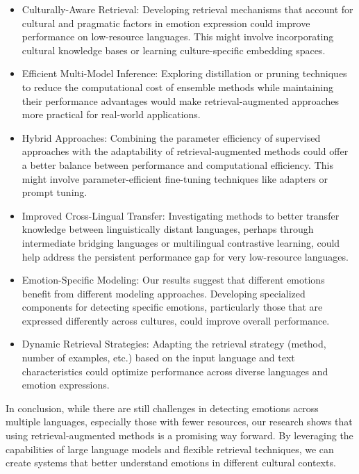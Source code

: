 \documentclass[a4paper,12pt]{extarticle}
\begin{document}
\begin{itemize}
    \item Culturally-Aware Retrieval: Developing retrieval mechanisms that account for cultural and pragmatic factors in emotion expression could improve performance on low-resource languages. This might involve incorporating cultural knowledge bases or learning culture-specific embedding spaces.
    
    \item Efficient Multi-Model Inference: Exploring distillation or pruning techniques to reduce the computational cost of ensemble methods while maintaining their performance advantages would make retrieval-augmented approaches more practical for real-world applications.
    
    \item Hybrid Approaches: Combining the parameter efficiency of supervised approaches with the adaptability of retrieval-augmented methods could offer a better balance between performance and computational efficiency. This might involve parameter-efficient fine-tuning techniques like adapters or prompt tuning.
    
    \item Improved Cross-Lingual Transfer: Investigating methods to better transfer knowledge between linguistically distant languages, perhaps through intermediate bridging languages or multilingual contrastive learning, could help address the persistent performance gap for very low-resource languages.
    
    \item Emotion-Specific Modeling: Our results suggest that different emotions benefit from different modeling approaches. Developing specialized components for detecting specific emotions, particularly those that are expressed differently across cultures, could improve overall performance.
    
    \item Dynamic Retrieval Strategies: Adapting the retrieval strategy (method, number of examples, etc.) based on the input language and text characteristics could optimize performance across diverse languages and emotion expressions.
\end{itemize}

In conclusion, while there are still challenges in detecting emotions across multiple languages, especially those with fewer resources, our research shows that using retrieval-augmented methods is a promising way forward. By leveraging the capabilities of large language models and flexible retrieval techniques, we can create systems that better understand emotions in different cultural contexts.
\end{document}
